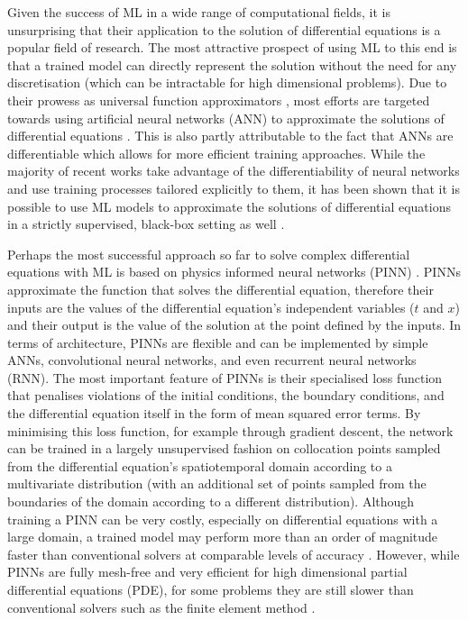 \documentclass{article}
\begin{document}
Given the success of ML in a wide range of computational fields, it is unsurprising that their application to the solution of differential equations is a popular field of research. The most attractive prospect of using ML to this end is that a trained model can directly represent the solution without the need for any discretisation (which can be intractable for high dimensional problems). Due to their prowess as universal function approximators \cite{hornik1991}, most efforts are targeted towards using artificial neural networks (ANN) to approximate the solutions of differential equations \cite{lagaris1998} \cite{lagaris2000} \cite{han2018}. This is also partly attributable to the fact that ANNs are differentiable which allows for more efficient training approaches. While the majority of recent works take advantage of the differentiability of neural networks and use training processes tailored explicitly to them, it has been shown that it is possible to use ML models to approximate the solutions of differential equations in a strictly supervised, black-box setting as well \cite{regazzoni2019}.

Perhaps the most successful approach so far to solve complex differential equations with ML is based on physics informed neural networks (PINN) \cite{raissi2017} \cite{tartakovsky2018} \cite{sirignano2018}. PINNs approximate the function that solves the differential equation, therefore their inputs are the values of the differential equation's independent variables ($t$ and $x$) and their output is the value of the solution at the point defined by the inputs. In terms of architecture, PINNs are flexible and can be implemented by simple ANNs, convolutional neural networks, and even recurrent neural networks (RNN). The most important feature of PINNs is their specialised loss function that penalises violations of the initial conditions, the boundary conditions, and the differential equation itself in the form of mean squared error terms. By minimising this loss function, for example through gradient descent, the network can be trained in a largely unsupervised fashion on collocation points sampled from the differential equation's spatiotemporal domain according to a multivariate distribution (with an additional set of points sampled from the boundaries of the domain according to a different distribution). Although training a PINN can be very costly, especially on differential equations with a large domain, a trained model may perform more than an order of magnitude faster than conventional solvers at comparable levels of accuracy \cite{misyris2019}. However, while PINNs are fully mesh-free and very efficient for high dimensional partial differential equations (PDE), for some problems they are still slower than conventional solvers such as the finite element method \cite{lu2019}.
\end{document}
